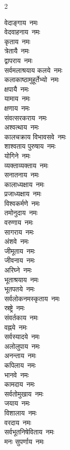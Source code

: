 \begin{multicols}{2}
\begin{flushleft}
वेदाङ्गाय~नमः\\
वेदवाहनाय~नमः\\
कृताय~नमः\\
त्रेतायै~नमः\\
द्वापराय~नमः\\
सर्वमलाश्रयाय कलये~नमः\\
कलाकाष्ठामुहूर्तेभ्यो~नमः\hfill{}\\
क्षपायै~नमः\\
यामाय~नमः\\
क्षणाय~नमः\\
संवत्सरकराय~नमः\\
अश्वत्थाय~नमः\\
कालचक्राय विभावसवे~नमः\\
शाश्वताय पुरुषाय~नमः\\
योगिने~नमः\\
व्यक्ताव्यक्ताय~नमः\\
सनातनाय~नमः\hfill{}\\
कालाध्यक्षाय~नमः\\
प्रजाध्यक्षाय~नमः\\
विश्वकर्मणे~नमः\\
तमोनुदाय~नमः\\
वरुणाय~नमः\\
सागराय~नमः\\
अंशवे~नमः\\
जीमूताय~नमः\\
जीवनाय~नमः\\
अरिघ्ने~नमः\hfill{}\\
भूताश्रयाय~नमः\\
भूतपतये~नमः\\
सर्वलोकनमस्कृताय~नमः\\
स्रष्ट्रे~नमः\\
संवर्तकाय~नमः\\
वह्नये~नमः\\
सर्वस्यादये~नमः\\
अलोलुपाय~नमः\\
अनन्ताय~नमः\\
कपिलाय~नमः\hfill{}\\
भानवे~नमः\\
कामदाय~नमः\\
सर्वतोमुखाय~नमः\\
जयाय~नमः\\
विशालाय~नमः\\
वरदाय~नमः\\
सर्वभूतनिषेविताय~नमः\\
मनः सुपर्णाय~नमः\\

\end{flushleft}
\end{multicols}
